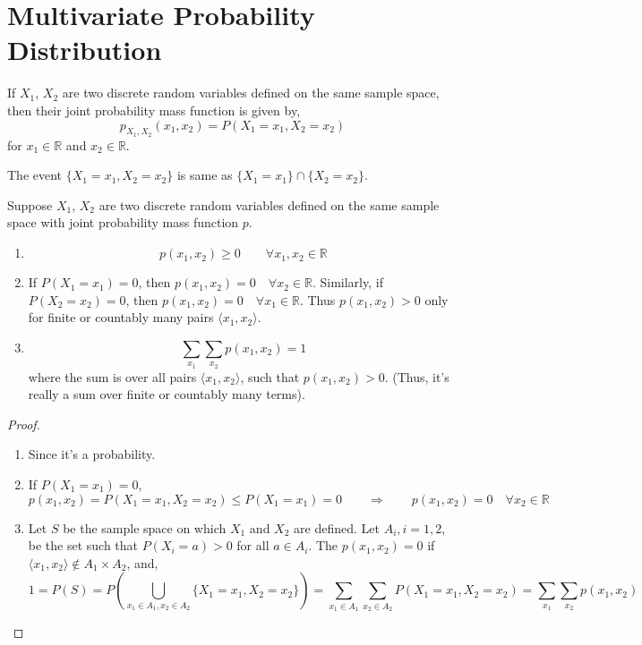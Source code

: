 \section{Multivariate Probability Distribution}
\begin{definition}
If $X_1$, $X_2$ are two discrete random variables defined on the same sample
space, then their joint probability mass function is given by,
\[
    p_{X_1, X_2}(x_1, x_2) = P(X_1 = x_1, X_2 = x_2)
\]
for $x_1 \in \mathbb{R}$ and $x_2 \in \mathbb{R}$.
\end{definition}
\note The event $\lbrace X_1 = x_1, X_2 = x_2 \rbrace$ is same as $\lbrace X_1
= x_1 \rbrace \cap \lbrace X_2 = x_2 \rbrace$.

\begin{theorem}
Suppose $X_1$, $X_2$ are two discrete random variables defined on the same
sample space with joint probability mass function $p$.
\begin{enumerate}[noitemsep, topsep=0em]
\item
\[
    p(x_1, x_2) \geq 0 \qquad \forall x_1, x_2 \in \mathbb{R}
\]
\item If $P(X_1 = x_1) = 0$, then $p(x_1, x_2) = 0 \quad \forall x_2 \in
\mathbb{R}$. Similarly, if $P(X_2 = x_2) = 0$, then $p(x_1, x_2) = 0 \quad
\forall x_1 \in \mathbb{R}$. Thus $p(x_1, x_2) > 0$ only for finite or
countably many pairs $\langle x_1, x_2 \rangle$.
\item
\[
    \sum_{x_1} \sum_{x_2} p(x_1, x_2) = 1
\]
where the sum is over all pairs $\langle x_1, x_2 \rangle$, such that $p(x_1,
x_2) > 0$. (Thus, it's really a sum over finite or countably many terms).
\end{enumerate}
\end{theorem}
\begin{proof} \quad                                                          \\
\begin{enumerate}[noitemsep, topsep=0em]
\item Since it's a probability.
\item If $P(X_1 = x_1) = 0$,
\[
    p(x_1, x_2) = P(X_1 = x_1, X_2 = x_2) \leq P(X_1 = x_1) = 0
    \qquad \Rightarrow \qquad
    p(x_1, x_2) = 0 \quad \forall x_2 \in \mathbb{R}
\]
\item Let $S$ be the sample space on which $X_1$ and $X_2$ are defined. Let
$A_i, i = 1, 2$, be the set such that $P(X_i = a) > 0$ for all $a \in A_i$. The
$p(x_1, x_2) = 0$ if $\langle x_1, x_2 \rangle \notin A_1 \times A_2$, and,
\[
    1 = P(S) = P \left(
                        \bigcup_{x_1 \in A_1, x_2 \in A_2}
                        \lbrace X_1 = x_1, X_2 = x_2 \rbrace
               \right)
             = \sum_{x_1 \in A_1} \sum_{x_2 \in A_2} P(X_1 = x_1, X_2 = x_2)
             = \sum_{x_1} \sum_{x_2} p(x_1, x_2)
\]
\end{enumerate}
\end{proof}

